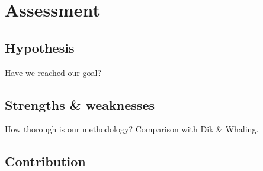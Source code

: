 \chapter{Assessment}
\label{chp:assessment}

\section{Hypothesis}
Have we reached our goal?
\section{Strengths \& weaknesses}
How thorough is our methodology? Comparison with Dik \& Whaling.
\section{Contribution}
